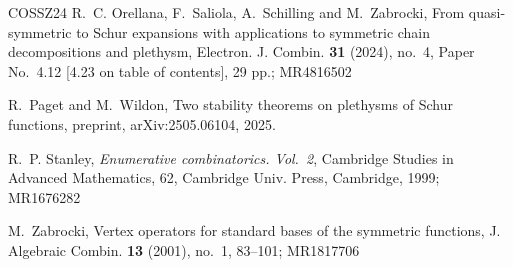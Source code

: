 \documentclass[reqno]{amsart}
\theoremstyle{plain}
\theoremstyle{definition}
\theoremstyle{remark}
\theoremstyle{plain}
\begin{document}
\begin{thebibliography}{COSSZ24}
 R.~C. Orellana, F.~Saliola, A.~Schilling and M.~Zabrocki, From quasi-symmetric to
Schur expansions with applications to symmetric chain decompositions and
plethysm, Electron. J. Combin. {\bf 31} (2024), no.~4, Paper No.~4.12
[4.23 on table of contents], 29 pp.; MR4816502

 R.~Paget and M.~Wildon, Two stability theorems on
plethysms of Schur functions, preprint, arXiv:2505.06104, 2025.

 R.~P. Stanley, {\it Enumerative combinatorics. Vol.~2},
Cambridge Studies in Advanced Mathematics, 62, Cambridge Univ. Press,
Cambridge, 1999; MR1676282

 M.~Zabrocki, Vertex operators for standard bases of
the symmetric functions, J. Algebraic Combin. {\bf 13} (2001), no.~1, 83--101;
MR1817706

\end{thebibliography}
\end{document}
